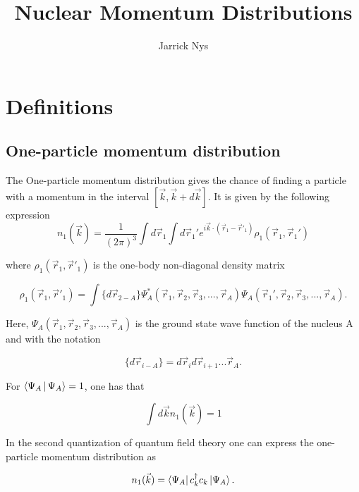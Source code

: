 \documentclass[12pt]{article}
\title{Nuclear Momentum Distributions}
\author{Jarrick Nys}
\begin{document}
\maketitle
\section{Definitions}

\subsection{One-particle momentum distribution}

The One-particle momentum distribution gives the chance of finding a particle with a momentum in the interval $[\vec{k},\vec{k}+d\vec{k}]$. It is given by the following expression
\begin{equation} \label{eq:one_patricle_distr}
	n_1(\vec{k})=\frac{1}{(2\pi)^3}\int d\vec{r}_1 \int d\vec{r}_1' e^{i\vec{k}\cdot (\vec{r}_1-\vec{r}'_1)}\rho_1(\vec{r}_1,\vec{r}_1')
\end{equation}

where $\rho_1(\vec{r}_1,\vec{r}'_1)$ is the one-body non-diagonal density matrix


\begin{equation}
\rho_1(\vec{r}_1,\vec{r}'_1) = \int \{d\vec{r}_{2-A}\} \Psi^*_A(\vec{r}_1,\vec{r}_2,\vec{r}_3, ... ,\vec{r}_A)\Psi_A(\vec{r}_1',\vec{r}_2,\vec{r}_3, ... ,\vec{r}_A).
\end{equation}



Here, $\Psi_A(\vec{r}_1,\vec{r}_2,\vec{r}_3, ... ,\vec{r}_A)$ is the ground state wave function of the nucleus A and with the notation 

\begin{equation}
\{d\vec{r}_{i-A}\}  = d\vec{r}_i d\vec{r}_{i+1}...\vec{r}_A.
\end{equation}
 


For $\Braket{\Psi_A|\Psi_A}=1$, one has that


\begin{equation}
\int d\vec{k}n_1(\vec{k})=1
\end{equation}

In the second quantization of quantum field theory one can express the one-particle momentum distribution as

\begin{equation}
n_1(\vec{k})= \bra{\Psi_A} c^\dagger_k c_k \ket{\Psi_A}.
\end{equation}
\end{document}
